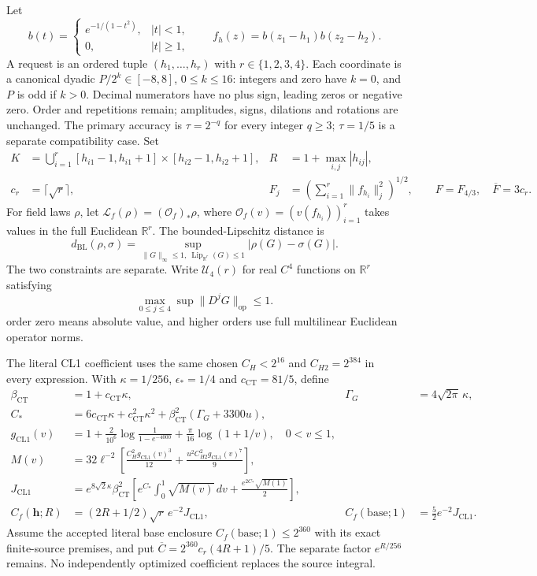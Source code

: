 \documentclass[11pt]{article}
\theoremstyle{plain}
\theoremstyle{definition}
\theoremstyle{remark}
\newcommand{\R}{\mathbb{R}}
\begin{document}
Let
\[
 b(t)=\begin{cases}e^{-1/(1-t^2)},&|t|<1,\\0,&|t|\ge1,\end{cases}
 \qquad f_h(z)=b(z_1-h_1)b(z_2-h_2).
\]
A request is an ordered tuple $(h_1,\ldots,h_r)$ with $r\in\{1,2,3,4\}$.
Each coordinate is a canonical dyadic $P/2^k\in[-8,8]$, $0\le k\le16$:
integers and zero have $k=0$, and $P$ is odd if $k>0$.
Decimal numerators have no plus sign, leading zeros or negative zero.
Order and repetitions remain; amplitudes, signs, dilations and rotations
are unchanged. The primary accuracy is $\tau=2^{-q}$ for every integer
$q\ge3$; $\tau=1/5$ is a separate compatibility case. Set
\begin{align*}
 K&=\bigcup_{i=1}^r[h_{i1}-1,h_{i1}+1]\times[h_{i2}-1,h_{i2}+1],&
 R&=1+\max_{i,j}|h_{ij}|,\\
 c_r&=\lceil\sqrt r\rceil,&
 F_j&=\left(\sum_{i=1}^r\|f_{h_i}\|_j^2\right)^{1/2},
 \qquad F=F_{4/3},\quad\overline F=3c_r.
\end{align*}
For field laws $\rho$, let $\mathcal L_f(\rho)=(\mathcal O_f)_*\rho$, where
$\mathcal O_f(v)=(v(f_{h_i}))_{i=1}^r$ takes values in the full Euclidean
$\R^r$. The bounded-Lipschitz distance is
\[
 d_{\mathrm{BL}}(\rho,\sigma)
 =\sup_{\|G\|_\infty\le1,\ \operatorname{Lip}_{\R^r}(G)\le1}
 |\rho(G)-\sigma(G)|.
\]
The two constraints are separate. Write $\mathcal U_4(r)$ for real $C^4$
functions on $\R^r$ satisfying
\[\max_{0\le j\le4}\sup\|D^jG\|_{\mathrm{op}}\le1.\]
order zero means absolute value, and higher orders use full multilinear
Euclidean operator norms.

The literal CL1 coefficient uses the same chosen $C_H<2^{16}$ and
$C_{H2}=2^{384}$ in every expression. With $\kappa=1/256$,
$\epsilon_*=1/4$ and $c_{\mathrm{CT}}=81/5$, define
\begin{align*}
 \beta_{\mathrm{CT}}&=1+c_{\mathrm{CT}}\kappa,
 &\Gamma_G&=4\sqrt{2\pi}\,\kappa,\\
 C_*&=6c_{\mathrm{CT}}\kappa+c_{\mathrm{CT}}^2\kappa^2
       +\beta_{\mathrm{CT}}^2(\Gamma_G+3300u),\\
 g_{\mathrm{CL1}}(v)&=1+\frac{2}{10^6}\log\frac1{1-e^{-4000}}
                  +\frac\pi{16}\log(1+1/v),\quad0<v\le1,\\
 M(v)&=32\ell^{-2}\left[\frac{C_H^2g_{\mathrm{CL1}}(v)^3}{12}
                     +\frac{u^2 C_{H2}^2g_{\mathrm{CL1}}(v)^7}{9}\right],\\
 J_{\mathrm{CL1}}&=e^{8\sqrt2\kappa}\beta_{\mathrm{CT}}^2
 \left[e^{C_*}\int_0^1\sqrt{M(v)}\,dv
            +\frac{e^{2C_*}\sqrt{M(1)}}2\right],\\
 C_f(\mathbf h;R)&=(2R+1/2)\sqrt r\,e^{-2}J_{\mathrm{CL1}},&
 C_f(\mathrm{base};1)&=\tfrac52 e^{-2}J_{\mathrm{CL1}}.
\end{align*}
Assume the accepted literal base enclosure $C_f(\mathrm{base};1)\le2^{360}$
with its exact finite-source premises, and put
$\overline C=2^{360}c_r(4R+1)/5$. The separate factor $e^{R/256}$ remains.
No independently optimized coefficient replaces the source integral.
\end{document}
